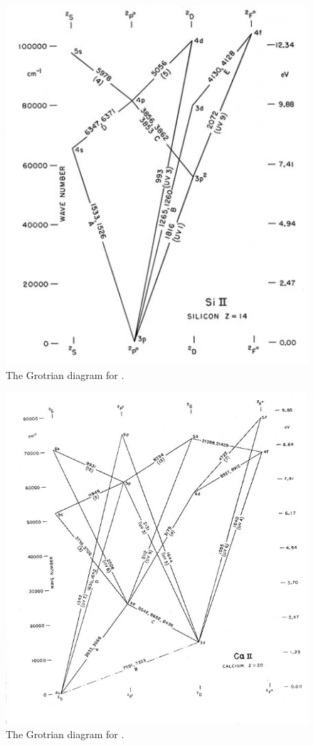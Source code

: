 \begin{figure}[t]
\centering
\includegraphics[width=\linewidth]{figures/grotrian-si-ii.jpg}
\caption{The Grotrian diagram for .}
\label{figure-grotrian-c-iv}
\end{figure}

\begin{figure}
\centering
\includegraphics[width=\linewidth]{figures/grotrian-ca-ii.jpg}
\caption{The Grotrian diagram for .}
\label{figure-grotrian-ca-ii}
\end{figure}

